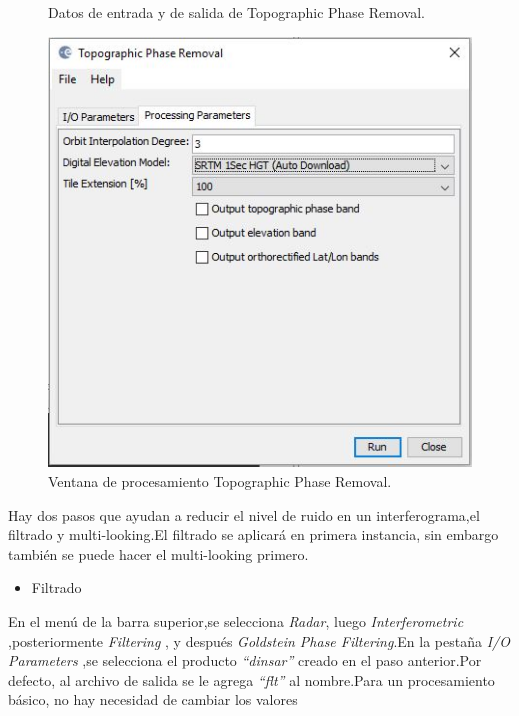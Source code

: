 \documentclass{article}
\begin{document}
\begin{figure}[htbp]
\begin{minipage}[b]{0.5\linewidth}
\caption{Datos de entrada y de salida de Topographic Phase Removal.}
\label{fig:figura11}
\end{minipage}
\hspace{0.2cm}
\begin{minipage}[b]{0.5\linewidth}
\centering
\includegraphics[width=\linewidth]{Imagen/12.JPG}
\caption{Ventana de procesamiento Topographic Phase Removal.}
\label{fig:figura12}
\end{minipage}
\end{figure}
Hay dos pasos que ayudan a reducir el nivel de ruido en un interferograma,el filtrado y multi-looking.El filtrado se aplicará en primera instancia, sin embargo también se puede hacer el multi-looking primero.
\begin{itemize}
    \item Filtrado 
\end{itemize} 
En el menú de la barra superior,se selecciona \textit{Radar}, luego \textit{Interferometric} ,posteriormente \textit{Filtering} , y después \textit{Goldstein Phase Filtering}.En la pestaña \textit{I/O Parameters} ,se selecciona el producto \textit{“dinsar”} creado en el paso anterior.Por defecto, al archivo de salida se le agrega \textit{“flt”} al nombre.Para un procesamiento básico, no hay necesidad de cambiar los valores
\end{document}
